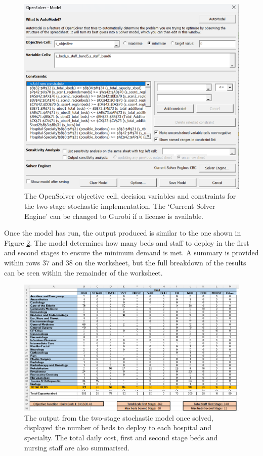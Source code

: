 \documentclass[../thesis.tex]{subfiles}
\begin{document}
\begin{figure}[h!]
    \centering
    \includegraphics[width=\textwidth]{Chapters/Chapter7/Figures/Stochastic2.png}
    \caption{The OpenSolver objective cell, decision variables and constraints for the two-stage stochastic implementation. The `Current Solver Engine' can be changed to Gurobi if a license is available.}
    \label{fig:exdm2}
\end{figure}
Once the model has run, the output produced is similar to the one shown in Figure \ref{fig:exdm1}. The model determines how many beds and staff to deploy in the first and second stages to ensure the minimum demand is met. A summary is provided within rows 37 and 38 on the worksheet, but the full breakdown of the results can be seen within the remainder of the worksheet.

\begin{figure}[h!]
    \centering
    \includegraphics[width=\textwidth]{Chapters/Chapter7/Figures/Stochastic1.png}
    \caption{The output from the two-stage stochastic model once solved, displayed the number of beds to deploy to each hospital and specialty. The total daily cost, first and second stage beds and nursing staff are also summarised.}
    \label{fig:exdm1}
\end{figure}
\end{document}
